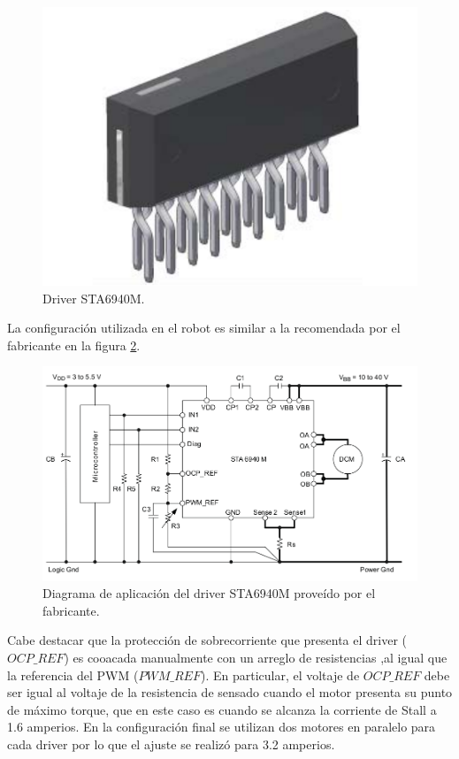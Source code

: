 \begin{figure}[H]
	\centering		\includegraphics[width=0.3\linewidth]{imagenes/prototipo/Driver}
	\caption{Driver STA6940M. }
	\label{imagen:Driver}
\end{figure}

La configuración utilizada en el robot es similar a la recomendada por el fabricante en la figura \ref{imagen:DriverAplicacion}.


\begin{figure}[H]
	\centering		\includegraphics[width=0.7\linewidth]{imagenes/prototipo/InformacionDeAplicacion}
	\caption{Diagrama de aplicación del driver STA6940M proveído por el fabricante.}
	\label{imagen:DriverAplicacion}
\end{figure}



Cabe destacar que la protección de sobrecorriente que presenta el driver ($OCP\_ REF$) es cooacada manualmente con un arreglo de resistencias ,al igual que la referencia del PWM ($PWM\_ REF$). En particular, el voltaje de $OCP\_ REF$ debe ser igual al voltaje de la resistencia de sensado cuando el motor presenta su punto de máximo torque, que en este caso es cuando se alcanza la corriente de Stall a 1.6 amperios. En la configuración final se utilizan dos motores en paralelo para cada driver por lo que el ajuste se realizó para 3.2 amperios.


